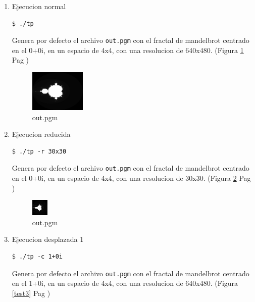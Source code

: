 \documentclass[10pt,spanish,a4paper,openany,notitlepage]{article}
\begin{document}
\begin{enumerate}

\item Ejecucion normal 
\begin{framed}
\begin{verbatim}$ ./tp \end{verbatim}
\end{framed}

Genera por defecto el archivo \texttt{out.pgm} con el fractal de mandelbrot centrado en el 0+0i, en un espacio de 4x4, con una resolucion de 640x480. (Figura \ref{test1} Pag \pageref{test1})

\begin{figure}[hbt]
\centering
\includegraphics[width=0.25\textwidth]{out.jpg}
\caption{out.pgm}
\label{test1}
\end{figure}

\item Ejecucion reducida
\begin{framed}
\begin{verbatim}$ ./tp -r 30x30 \end{verbatim}
\end{framed}

Genera por defecto el archivo \texttt{out.pgm} con el fractal de mandelbrot centrado en el 0+0i, en un espacio de 4x4, con una resolucion de 30x30. (Figura \ref{test2} Pag \pageref{test2})

\begin{figure}[hbt]
\centering
\includegraphics[]{out2.jpg}
\caption{out.pgm}
\label{test2}
\end{figure}

\item Ejecucion desplazada 1
\begin{framed}
\begin{verbatim}$ ./tp -c 1+0i \end{verbatim}
\end{framed}

Genera por defecto el archivo \texttt{out.pgm} con el fractal de mandelbrot centrado en el 1+0i, en un espacio de 4x4, con una resolucion de 640x480. (Figura \ref{test3} Pag \pageref{test3})


\end{enumerate}
\end{document}
